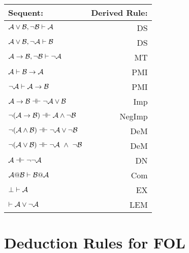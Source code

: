 \begin{center}
\begin{tabular}{l  r}
\textbf{Sequent:}                    &       \textbf{Derived Rule:} \\ \hline
$\mathcal{A} \vee \mathcal{B},  \neg\mathcal{B} \vdash \mathcal{A}$ & DS\\
$\mathcal{A} \vee \mathcal{B},  \neg\mathcal{A}\vdash \mathcal{B}$    &      DS  \\
$\mathcal{A} \rightarrow \mathcal{B},  \neg\mathcal{B} \vdash \neg \mathcal{A}$   &                       MT  \\
$\mathcal{A} \vdash\mathcal{B} \rightarrow \mathcal{A}$  &              PMI  \\
$\neg\mathcal{A}\vdash\mathcal{A}\rightarrow \mathcal{B}$  & PMI\\
$\meta{A} \rightarrow\meta{B} \pequiv \enot\meta{A}\eor \meta{B}$  &                   Imp   \\
$\enot (\meta{A} \rightarrow \meta{B}) \pequiv \meta{A} \eand \enot \meta{B}$  &               NegImp  \\
$\enot (\meta{A} \eand \meta{B})  \pequiv \enot\meta{A}\eor \enot \meta{B}$  &                DeM  \\
$\enot (\meta{A} \eor \meta{B}) \pequiv \enot\meta{A}\ \eand \ \enot \meta{B}$   &               DeM  \\
$\meta{A} \pequiv \enot \enot \meta{A}$     &                              DN  \\
$\mathcal{A} @ \mathcal{B}  \vdash  \mathcal{B} @ \mathcal{A}$ &                          Com \\
$\bot \vdash \mathcal{A}$ & EX \\
 $\vdash \mathcal{A}\vee \neg \mathcal{A}$ &                                                    LEM \\ 
\end{tabular}
\end{center}


\newpage

\section*{Deduction Rules for FOL}

